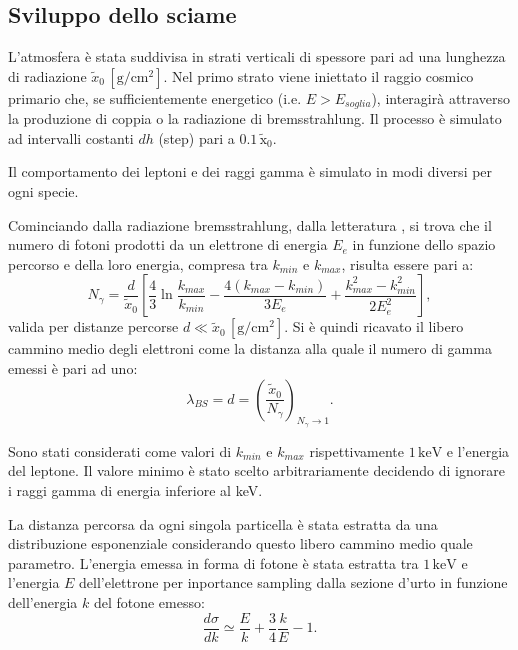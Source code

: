 \documentclass[10pt,a4paper,usenatbib]{article}
\newcommand*{\unit}[1]{\ensuremath{\mathrm{\,#1}}}                              %
\begin{document}
\subsection{Sviluppo dello sciame}
L'atmosfera è stata suddivisa in strati verticali di spessore pari ad una lunghezza di radiazione $\tilde{x}_0 \unit{[g/cm^2]}$. Nel primo strato viene iniettato il raggio cosmico primario che, se sufficientemente energetico (i.e. $E > E_{soglia}$), interagirà attraverso la produzione di coppia o la radiazione di bremsstrahlung. Il processo è simulato ad intervalli costanti $dh$ (step) pari a $0.1\unit{\tilde{x}_0}$.

Il comportamento dei leptoni e dei raggi gamma è simulato in modi diversi per ogni specie.
 
Cominciando dalla radiazione bremsstrahlung, dalla letteratura \citep{PassParticMatterPDG}, si trova che il numero di fotoni prodotti da un elettrone di energia $E_e$ in funzione dello spazio percorso e della loro energia, compresa tra $k_{min}$ e $k_{max}$, risulta essere pari a: 
\begin{equation}
N_\gamma = \frac{d}{\tilde{x}_0}\left[\frac{4}{3}\ln{\frac{k_{max}}{k_{min}}}-\frac{4(k_{max} - k_{min})}{3E_e}+\frac{k_{max}^2 - k_{min}^2}{2E_e^2}\right],
\label{eq:Ngamma}
\end{equation}
valida per distanze percorse $d \ll \tilde{x}_0 \unit{[g/cm^2]}$. Si è quindi ricavato il libero cammino medio degli elettroni come la distanza alla quale il numero di gamma emessi è pari ad uno:
\begin{equation}
\lambda_{BS} = d = \left({\frac{\tilde{x}_0}{N_\gamma}}\right)_{N_\gamma \rightarrow 1}.
\label{eq:lambdaBS}
\end{equation}

Sono stati considerati come valori di $k_{min}$ e $k_{max}$ rispettivamente $1\unit{keV}$ e l'energia del leptone. Il valore minimo è stato scelto arbitrariamente decidendo di ignorare i raggi gamma di energia inferiore al keV.

La distanza percorsa da ogni singola particella è stata estratta da una distribuzione esponenziale considerando questo libero cammino medio quale parametro. L'energia emessa in forma di fotone è stata estratta tra $1 \unit{keV}$ e l'energia $E$ dell'elettrone per inportance sampling dalla sezione d'urto in funzione dell'energia $k$ del fotone emesso:
\begin{equation}
\frac{d\sigma}{dk} \simeq \frac{E}{k} + \frac 3 4 \frac{k}{E} - 1.
\label{eq:dSigma}
\end{equation}
\end{document}
